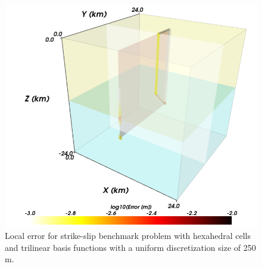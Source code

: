 \noindent \begin{center}
\begin{figure}[H]
\begin{centering}
\includegraphics[scale=0.33]{benchmarks/strikeslip/figs/error_hex8_0250m}
\par\end{centering}

\caption{Local error for strike-slip benchmark problem with hexahedral cells
and trilinear basis functions with a uniform discretization size of
250 m.\label{fig:benchmark:strikeslip:hex8:250m}}
\end{figure}

\par\end{center}

